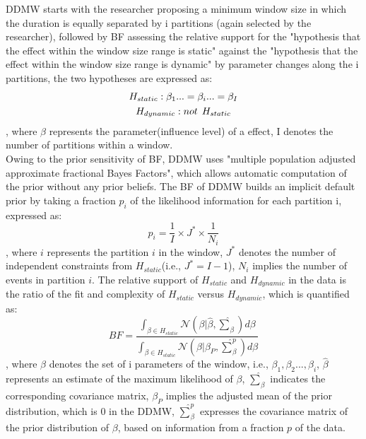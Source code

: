 \documentclass[]{interact}
\theoremstyle{plain}%
\theoremstyle{definition}
\theoremstyle{remark}
\begin{document}
{	DDMW starts with the researcher proposing a minimum window size in which the duration is equally separated by i partitions (again selected by the researcher), followed by BF assessing the relative support for the "hypothesis that the effect within the window size range is static" against the "hypothesis that the effect within the window size range is dynamic" by parameter changes along the i partitions, the two hypotheses are expressed as:
	\begin{gather} \label{4, 5}
		H_{static}: \beta_1... = \beta_i... = \beta_I \\ 
		H_{dynamic}: not\hspace{0.15cm} H_{static}
	\end{gather} 
	, where $\beta$ represents the parameter(influence level) of a effect, I denotes the number of partitions within a window.\\
	
	Owing to the prior sensitivity of BF, DDMW uses "multiple population adjusted approximate fractional Bayes Factors", which allows automatic computation of the prior without any prior beliefs. The BF of DDMW builds an implicit default prior by taking a fraction $p_i$ of the likelihood information for each partition i, expressed as\cite{hoijtinkBayesianEvaluationInformative2019}:
	\begin{equation} \label{6}
		p_i = \dfrac{1}{I} \times J^* \times \dfrac{1}{N_i}
	\end{equation}
	, where $i$ represents the partition $i$ in the window, $J^*$ denotes the number of independent constraints from $H_{static}$(i.e., $J^* = I - 1$), $N_i$ implies the number of events in partition $i$. The relative support of $H_{static}$ and $H_{dynamic}$ in the data is the ratio of the fit and complexity of $H_{static}$ versus $H_{dynamic}$, which is quantified as\cite{meijerink-bosmanDynamicRelationalEvent2022}: 
	\begin{equation} \label{7}
		BF = \dfrac{\int_{\beta \in H_{static}} \mathcal{N}(\beta|\hat{\beta}, \hat{\sum}_{\beta}) d\beta}
		{\int_{\beta \in H_{static}} \mathcal{N}(\beta|\beta_P, \hat{\sum} ^p _{\beta}) d\beta}
	\end{equation}
	, where $\beta$ denotes the set of i parameters of the window, i.e., $\beta_1, \beta_2... , \beta_i$, $\hat{\beta}$ represents an estimate of the maximum likelihood of $\beta$, $\hat{\sum}_\beta$ indicates the corresponding covariance matrix, $\beta_P$ implies the adjusted mean of the prior distribution, which is 0 in the DDMW, $\hat{\sum} ^p _\beta$ expresses the covariance matrix of the prior distribution of $\beta$, based on information from a fraction $p$ of the data.\\
	
}
\end{document}
